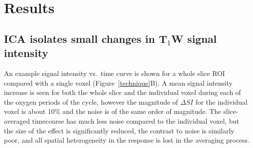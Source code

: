 \section{Results}

\subsection{\texorpdfstring{\acs{ICA}}{ICA} isolates small changes in \texorpdfstring{T$_1$}{T1}W signal intensity}
\label{res1}

An example signal intensity vs.\ time curve is shown for a whole slice ROI compared with a single voxel (Figure~\ref{technique}B).
A mean signal intensity increase is seen for both the whole slice and the individual voxel during each of the oxygen periods of the cycle, however the magnitude of $\Delta SI$ for the individual voxel is about 10\% and the noise is of the same order of magnitude.
The slice-averaged timecourse has much less noise compared to the individual voxel, but the size of the effect is significantly reduced, the contrast to noise is similarly poor, and all spatial heterogeneity in the response is lost in the averaging process.

